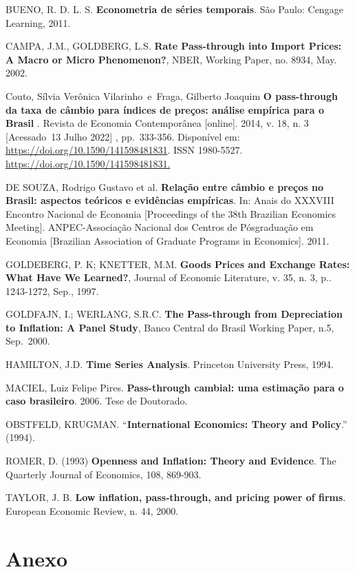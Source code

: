 \documentclass[12pt]{article}
\begin{document}
BUENO, R. D. L. S. \textbf{Econometria de séries temporais}. São Paulo:
Cengage Learning, 2011.

CAMPA, J.M., GOLDBERG, L.S. \textbf{Rate Pass-through into Import
Prices: A Macro or Micro Phenomenon?}, NBER, Working Paper, no. 8934,
May. 2002.

Couto, Sílvia Verônica Vilarinho~e~Fraga, Gilberto Joaquim \textbf{O
pass-through da taxa de câmbio para índices de preços: análise empírica
para o Brasil} . Revista de Economia Contemporânea {[}online{]}. 2014,
v. 18, n. 3 {[}Acessado~13 Julho 2022{]} , pp.~333-356. Disponível em:
\url{https://doi.org/10.1590/141598481831}. ISSN 1980-5527.
\url{https://doi.org/10.1590/141598481831.}

DE SOUZA, Rodrigo Gustavo et al. \textbf{Relação entre câmbio e preços
no Brasil: aspectos teóricos e evidências empíricas}. In: Anais do
XXXVIII Encontro Nacional de Economia {[}Proceedings of the 38th
Brazilian Economics Meeting{]}. ANPEC-Associação Nacional dos Centros de
Pósgraduação em Economia {[}Brazilian Association of Graduate Programs
in Economics{]}. 2011.

GOLDEBERG, P. K; KNETTER, M.M. \textbf{Goods Prices and Exchange Rates:
What Have We Learned?}, Journal of Economic Literature, v. 35, n. 3, p..
1243-1272, Sep., 1997.

GOLDFAJN, I.; WERLANG, S.R.C. \textbf{The Pass-through from Depreciation
to Inflation: A Panel Study}, Banco Central do Brasil Working Paper,
n.5, Sep.~2000.

HAMILTON, J.D. \textbf{Time Series Analysis}. Princeton University
Press, 1994.

MACIEL, Luiz Felipe Pires. \textbf{Pass-through cambial: uma estimação
para o caso brasileiro}. 2006. Tese de Doutorado.

OBSTFELD, KRUGMAN. ``\textbf{International Economics: Theory and
Policy}.'' (1994).

ROMER, D. (1993) \textbf{Openness and Inflation: Theory and Evidence}.
The Quarterly Journal of Economics, 108, 869-903.

TAYLOR, J. B. \textbf{Low inflation, pass‑through, and pricing power of
firms}. European Economic Review, n. 44, 2000.

\hypertarget{anexo}{%
\section{Anexo}\label{anexo}}
\end{document}
